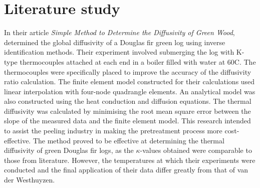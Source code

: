 \section{Literature study}\label{litstudy}

	
	In their article \textit{Simple Method to Determine the Diffusivity of Green Wood}, \citet{bioresource:2020}  determined the global diffusivity of a Douglas fir green log using inverse identification methods. 
	Their experiment involved submerging the log with K-type thermocouples attached at each end in a boiler filled with water at 60\textdegree C.
	The thermocouples were specifically placed to improve the accuracy of the diffusivity ratio calculation.
	The finite element model constructed for their calculations used linear interpolation with four-node quadrangle elements.
	An analytical model was also constructed using the heat conduction and diffusion equations.
	The thermal diffusivity was calculated by minimising the root mean square error between the slope of the measured data and the finite element model.
	This research intended to assist the peeling industry in making the pretreatment process more cost-effective.
	The method proved to be effective at determining the thermal diffusivity of green Douglas fir logs, as the $\kappa$-values obtained were comparable to those from literature.
However, the temperatures at which their experiments were conducted and the final application of their data differ greatly from that of van der Westhuyzen.

